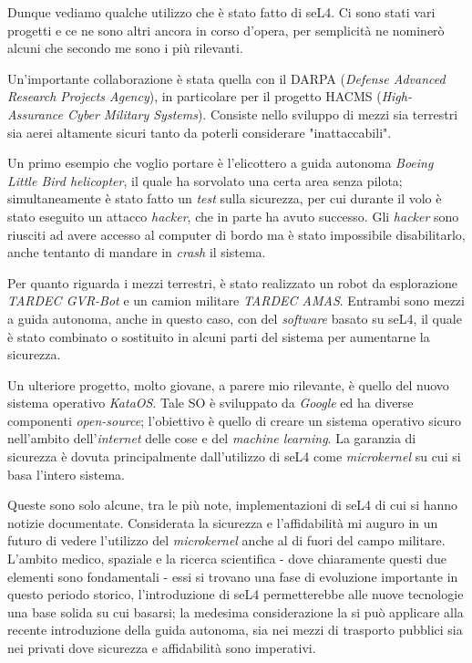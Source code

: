 Dunque vediamo qualche utilizzo che è stato fatto di seL4. Ci sono stati vari progetti e ce ne sono altri ancora in corso d'opera, per semplicità ne nominerò alcuni che secondo me sono i più rilevanti. 

Un'importante collaborazione è stata quella con il DARPA (\textit{Defense Advanced Research Projects Agency}), in particolare per il progetto HACMS (\textit{High-Assurance Cyber Military Systems}). Consiste nello sviluppo di mezzi sia terrestri sia aerei altamente sicuri tanto da poterli considerare "inattaccabili".

Un primo esempio che voglio portare è l'elicottero a guida autonoma \textit{Boeing Little Bird helicopter}, il quale ha sorvolato una certa area senza pilota; simultaneamente è stato fatto un \textit{test} sulla sicurezza, per cui durante il volo è stato eseguito un attacco \textit{hacker}, che in parte ha avuto successo. Gli \textit{hacker} sono riusciti ad avere accesso al computer di bordo ma è stato impossibile disabilitarlo, anche tentanto di mandare in \textit{crash} il sistema.

Per quanto riguarda i mezzi terrestri, è stato realizzato un robot da esplorazione \textit{TARDEC GVR-Bot} e un camion militare \textit{TARDEC AMAS}. Entrambi sono mezzi a guida autonoma, anche in questo caso, con del \textit{software} basato su seL4, il quale è stato combinato o sostituito in alcuni parti del sistema per aumentarne la sicurezza.

Un ulteriore progetto, molto giovane, a parere mio rilevante, è quello del nuovo sistema operativo \textit{KataOS}. Tale SO è sviluppato da \textit{Google} ed ha diverse componenti \textit{open-source}; l'obiettivo è quello di creare un sistema operativo sicuro nell'ambito dell'\textit{internet} delle cose e del \textit{machine learning}. La garanzia di sicurezza è dovuta principalmente dall'utilizzo di seL4 come \textit{microkernel} su cui si basa l'intero sistema.

Queste sono solo alcune, tra le più note, implementazioni di seL4 di cui si hanno notizie documentate. Considerata la sicurezza e l'affidabilità mi auguro in un futuro di vedere l'utilizzo del \textit{microkernel} anche al di fuori del campo militare. L'ambito medico, spaziale e la ricerca scientifica - dove chiaramente questi due elementi sono fondamentali - essi si trovano una fase di evoluzione importante in questo periodo storico, l'introduzione di seL4 permetterebbe alle nuove tecnologie una base solida su cui basarsi; la medesima considerazione la si può applicare alla recente introduzione della guida autonoma, sia nei mezzi di trasporto pubblici sia nei privati dove sicurezza e affidabilità sono imperativi.
\newpage

